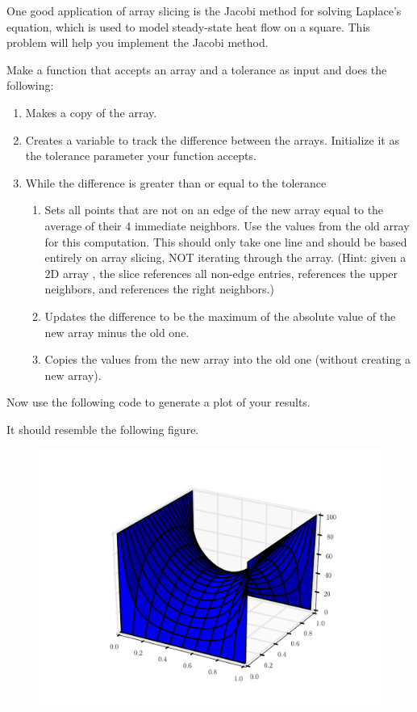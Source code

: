 \begin{problem} 
One good application of array slicing is the Jacobi
method for solving Laplace's equation, which is used to model
steady-state heat flow on a square. This problem will help you implement the Jacobi method.

Make a function that accepts an array and a tolerance as input and does the
following: 
\begin{enumerate}
\item Makes a copy of the array. 
\item Creates a variable to track the difference between the arrays. Initialize
it as the tolerance parameter your function accepts. 
\item While the difference is greater than or equal
to the tolerance 
\begin{enumerate} 
\item Sets all points that are not on an edge of the new array equal to the average of their 4 immediate neighbors. 
Use the values from the old array for this computation. 
This should only take one line and should be based entirely on array slicing, NOT iterating through the array.
(Hint: given a 2D array , the slice  references
all non-edge entries,  references the upper neighbors,
and  references the right neighbors.) 
\item Updates the difference to be the maximum of the absolute value of the new array
minus the old one. 
\item Copies the values from the new array into the old
one (without creating a new array). 
\end{enumerate} 
\end{enumerate}

Now use the following code to generate a plot of your results.
 
It should resemble the following figure.

\begin{figure} [H]
\includegraphics[width=.75\textwidth]{laplace.pdf}
\end{figure} 
\end{problem}


